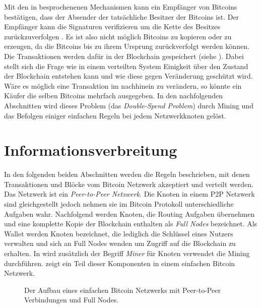 \documentclass[ngerman,runningheads,a4paper]{llncs}[2018/03/10]
\begin{document}
Mit den in  besprochenenen Mechanismen kann ein Empfänger von Bitcoins bestätigen, dass der Absender der tatsächliche Besitzer der Bitcoins ist. Der Empfänger kann die Signaturen verifizieren um die Kette des Besitzes zurückzuverfolgen \citep{bitcoinPDF}. Es ist also nicht möglich Bitcoins zu kopieren oder zu erzeugen, da die Bitcoins bis zu ihrem Ursprung zurückverfolgt werden können. Die Transaktionen werden dafür in der Blockchain gespeichert (siehe ). Dabei stellt sich die Frage wie in einem verteilten System Einigkeit über den Zustand der Blockchain entstehen kann und wie diese gegen Veränderung geschützt wird. Wäre es möglich eine Transaktion im nachhinein zu verändern, so könnte ein Käufer die selben Bitcoins mehrfach ausgegeben. In den nachfolgenden Abschnitten wird dieses Problem (das \textit{Double-Spend Problem}) durch Mining und das Befolgen einiger einfachen Regeln bei jedem Netzwerkknoten gelöst.


\section{Informationsverbreitung}\label{sec:informationsverbreitung}

In den folgenden beiden Abschnitten werden die Regeln beschrieben, mit denen Transaktionen und Blöcke vom Bitcoin Netzwerk akzeptiert und verteilt werden. Das Netzwerk ist ein \textit{Peer-to-Peer Netzwerk}. Die Knoten in einem P2P Netzwerk sind gleichgestellt jedoch nehmen sie im Bitcoin Protokoll unterschiedliche Aufgaben wahr. Nachfolgend werden Knoten, die Routing Aufgaben übernehmen und eine komplette Kopie der Blockchain enthalten als \textit{Full Nodes} bezeichnet. Als Wallet werden Knoten bezeichnet, die lediglich die Schlüssel eines Nutzers verwalten und sich an Full Nodes wenden um Zugriff auf die Blockchain zu erhalten. In  wird zusätzlich der Begriff \textit{Miner} für Knoten verwendet die Mining durchführen.  zeigt ein Teil dieser Komponenten in einem einfachen Bitcoin Netzwerk. 

\begin{figure}
  \centering
  \caption{Der Aufbau eines einfachen Bitcoin Netzwerks mit Peer-to-Peer Verbindungen und Full Nodes.}
  \label{fig:basicNetwork}
\end{figure}
\end{document}
